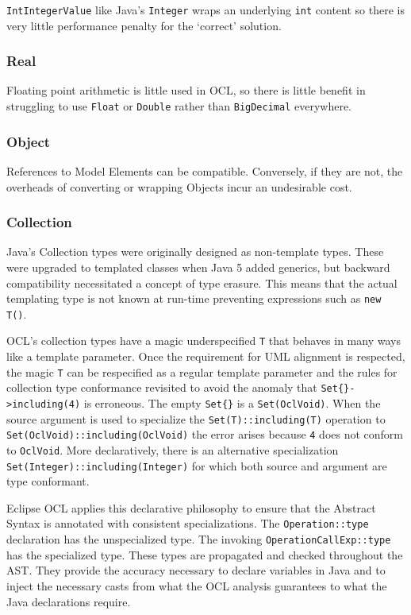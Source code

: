 \documentclass[sigconf]{acmart}
\begin{document}
\texttt{IntIntegerValue} like Java's \texttt{Integer} wraps an underlying \texttt{int} content so there is very little performance penalty for the `correct' solution.

\subsubsection{Real}

Floating point arithmetic is little used in OCL, so there is little benefit in struggling to use \verb|Float| or \verb|Double| rather than \verb|BigDecimal| everywhere.

\subsubsection{Object}

References to Model Elements can be compatible. Conversely, if they are not, the overheads of converting or wrapping Objects incur an undesirable cost.

\subsubsection{Collection}

Java's Collection types were originally designed as non-template types. These were upgraded to templated classes when Java 5 added generics, but backward compatibility necessitated a concept of type erasure. This means that the actual templating type is not known at run-time preventing expressions such as \verb|new T()|.

OCL's collection types have a magic underspecified \verb|T| that behaves in many ways like a template parameter. Once the requirement for UML alignment is respected, the magic \verb|T| can be respecified as a regular template parameter and the rules for collection type conformance revisited to avoid the anomaly that \verb|Set{}->including(4)| is erroneous. The empty \verb|Set{}| is a \verb|Set(OclVoid)|. When the source argument is used to specialize the \verb|Set(T)::including(T)| operation to \verb|Set(OclVoid)::including(OclVoid)| the error arises because \verb|4| does not conform to \verb|OclVoid|. More declaratively, there is an alternative specialization \verb|Set(Integer)::including(Integer)| for which both source and argument are type conformant.

Eclipse OCL applies this declarative philosophy to ensure that the Abstract Syntax is annotated with consistent specializations. The \verb|Operation::type| declaration has the unspecialized type. The invoking \verb|OperationCallExp::type| has the specialized type. 
These types are propagated and checked throughout the AST. They provide the accuracy necessary to declare variables in Java and to inject the necessary casts from what the OCL analysis guarantees to what the Java declarations require.
\end{document}

